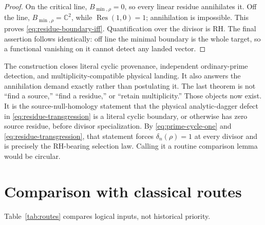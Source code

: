 \documentclass[11pt]{article}
\theoremstyle{definition}
\theoremstyle{remark}
\newcommand{\C}{\mathbb C}
\begin{document}
\begin{proof}
On the critical line, \(B_{\min,\rho}=0\), so every linear residue
annihilates it.  Off the line,
\(B_{\min,\rho}=\C^2\), while \(\operatorname{Res}(1,0)=1\); annihilation is
impossible.  This proves \eqref{eq:residue-boundary-iff}.  Quantification over
the divisor is RH.  The final assertion follows identically: off line the
minimal boundary is the whole target, so a functional vanishing on it cannot
detect any landed vector.
\end{proof}

The construction closes literal cyclic provenance, independent
ordinary-prime detection, and multiplicity-compatible physical landing.  It
also answers the annihilation demand exactly rather than postulating it.  The
last theorem is not ``find a source,'' ``find a residue,'' or ``retain
multiplicity.''  Those objects now exist.  It is the source-null-homology
statement that the physical analytic-dagger defect in
\eqref{eq:residue-transgression} is a literal cyclic boundary, or otherwise
has zero source residue, before divisor specialization.  By
\eqref{eq:prime-cycle-one} and \eqref{eq:residue-transgression}, that
statement forces \(\delta_n(\rho)=1\) at every divisor and is precisely the
RH-bearing selection law.  Calling it a routine comparison lemma would be
circular.

\section{Comparison with classical routes}

Table~\ref{tab:routes} compares logical inputs, not historical priority.
\end{document}

